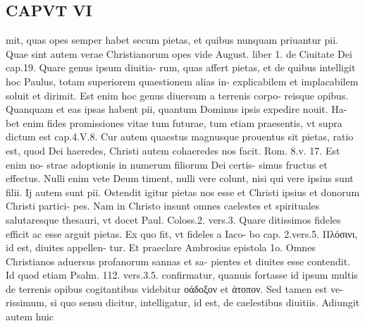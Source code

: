 \documentclass{article}
\begin{document}
\begin{pages}
\section*{CAPVT VI }
\marginpar{[ p.437 ]}\pstart mit, quas opes semper habet secum pietas, et quibus nunquam priuantur pii. Quae sint autem verae Christianorum opes vide August. liber 1. de Ciuitate Dei cap.19. Quare genus ipsum diuitia- rum, quas affert pietas, et de quibus intelligit hoc Paulus, totam superiorem quaestionem alias in- explicabilem et implacabilem soluit et dirimit. Est enim hoc genus diuersum a terrenis corpo- reisque opibus. Quanquam et eas ipsas habent pii, quantum Dominus ipsis expedire nouit. Ha- bet enim fides promissiones vitae tum futurae, tum etiam praesentis, vt supra dictum est cap.4.V.8.  \pend\pstart Cur autem quaestus magnusque prouentus sit pietas, ratio est, quod Dei haeredes, Christi autem cohaeredes nos facit. Rom. 8.v. 17. Est enim no- strae adoptionis in numerum filiorum Dei certis- simus fructus et effectus. Nulli enim vete Deum timent, nulli vere colunt, nisi qui vere ipsius sunt filii. Ij autem sunt pii. Ostendit igitur pietas nos esse et Christi ipsius et donorum Christi partici- pes. Nam in Christo insunt omnes caelestes et spirituales salutaresque thesauri, vt docet Paul. Coloss.2. vers.3. Quare ditissimos fideles efficit ac esse arguit pietas. Ex quo fit, vt fideles a Iaco- bo cap. 2.vers.5. Πλόσινι, id est, diuites appellen- tur. Et praeclare Ambrosius epistola 1o. Omnes Christianos aduersus profanorum sannas et sa- pientes et diuites esse contendit. Id quod etiam Psalm. 112. vers.3.5. confirmatur, quanuis fortasse id ipsum multis de terrenis opibus cogitantibus videbitur οάδοξον et ἀτοπον. Sed tamen est ve- rissimum, si quo sensu dicitur, intelligatur, id est, de caelestibus diuitiis. Adiungit autem huic  \pend

\end{pages}
\end{document}
